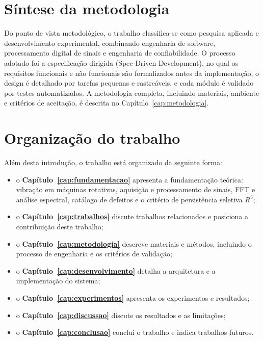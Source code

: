 \section{Síntese da metodologia}

Do ponto de vista metodológico, o trabalho classifica-se como pesquisa
aplicada e desenvolvimento experimental, combinando engenharia de software,
processamento digital de sinais e engenharia de confiabilidade. O processo
adotado foi a especificação dirigida (Spec-Driven Development), no qual os
requisitos funcionais e não funcionais são formalizados antes da implementação,
o design é detalhado por tarefas pequenas e rastreáveis, e cada módulo é
validado por testes automatizados. A metodologia completa, incluindo materiais,
ambiente e critérios de aceitação, é descrita no Capítulo~\ref{cap:metodologia}.

\section{Organização do trabalho}

Além desta introdução, o trabalho está organizado da seguinte forma:

\begin{itemize}
  \item o \textbf{Capítulo~\ref{cap:fundamentacao}} apresenta a fundamentação
  teórica: vibração em máquinas rotativas, aquisição e processamento de sinais,
  FFT e análise espectral, catálogo de defeitos e o critério de persistência
  seletiva \(R^3\);
  \item o \textbf{Capítulo~\ref{cap:trabalhos}} discute trabalhos relacionados
  e posiciona a contribuição deste trabalho;
  \item o \textbf{Capítulo~\ref{cap:metodologia}} descreve materiais e métodos,
  incluindo o processo de engenharia e os critérios de validação;
  \item o \textbf{Capítulo~\ref{cap:desenvolvimento}} detalha a arquitetura e a
  implementação do sistema;
  \item o \textbf{Capítulo~\ref{cap:experimentos}} apresenta os experimentos e
  resultados;
  \item o \textbf{Capítulo~\ref{cap:discussao}} discute os resultados e as
  limitações;
  \item o \textbf{Capítulo~\ref{cap:conclusao}} conclui o trabalho e indica
  trabalhos futuros.
\end{itemize}
